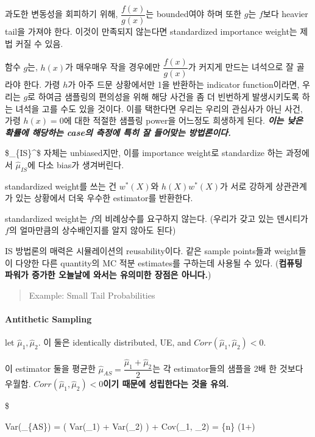\documentclass[
]{book}
\begin{document}
과도한 변동성을 회피하기 위해, \(\dfrac {f(x)} {g(x)}\)는 bounded여야 하며 또한 \(g\)는 \(f\)보다 heavier tail을 가져야 한다. 이것이 만족되지 않는다면 standardized importance weight는 제법 커질 수 있음.

함수 \(g\)는, \(h(x)\)가 매우매우 작을 경우에만 \(\dfrac {f(x)} {g(x)}\)가 커지게 만드는 녀석으로 잘 골라야 한다. 가령 \(h\)가 아주 드문 상황에서만 1을 반환하는 indicator function이라면, 우리는 \(g\)로 하여금 샘플링의 편의성을 위해 해당 사건을 좀 더 빈번하게 발생시키도록 하는 녀석을 고를 수도 있을 것이다. 이를 택한다면 우리는 우리의 관심사가 아닌 사건, 가령 \(h(x)=0\)에 대한 적절한 샘플링 power을 어느정도 희생하게 된다. \textbf{\emph{이는 낮은 확률에 해당하는 case의 측정에 특히 잘 들어맞는 방법론이다.}}

\$\hat \mu\_\{IS\}\^{}\ast \$ 자체는 unbiased지만, 이를 importance weight로 standardize 하는 과정에서 \(\hat \mu_{IS}\)에 다소 bias가 생겨버린다.

standardized weight를 쓰는 건 \(w^\ast(X)\)와 \(h(X)w^\ast(X)\)가 서로 강하게 상관관계가 있는 상황에서 더욱 우수한 estimator를 반환한다.

standardized weight는 \(f\)의 비례상수를 요구하지 않는다. (우리가 갖고 있는 덴시티가 \(f\)의 얼마만큼의 상수배인지를 알지 않아도 된다)

IS 방법론의 매력은 시뮬레이션의 reusability이다. 같은 sample points들과 weight들이 다양한 다른 quantity의 MC 적분 estimates를 구하는데 사용될 수 있다. (\textbf{컴퓨팅 파워가 증가한 오늘날에 와서는 유의미한 장점은 아니다.})

\begin{quote}
Example: Small Tail Probabilities
\end{quote}

\hypertarget{antithetic-sampling}{%
\paragraph{Antithetic Sampling}\label{antithetic-sampling}}

let \(\hat \mu_1, \hat \mu_2\). 이 둘은 identically distributed, UE, and \(Corr(\hat \mu_1, \hat \mu_2)<0\).

이 estimator 둘을 평균한 \(\hat \mu_{AS} = \dfrac{\hat \mu_1 + \hat \mu_2}{2}\)는 각 estimator들의 샘플을 2배 한 것보다 우월함. \textbf{\(Corr(\hat \mu_1, \hat \mu_2)<0\)이기 때문에 성립한다는 것을 유의.}

\$

Var(\hat \mu\_\{AS\}) =  \left( Var(\hat \mu\_1) + Var(\hat \mu\_2) \right) +  Cov(\hat \mu\_1, \hat \mu\_2) =  \ast {} \{n\} (1+\rho)
\end{document}
